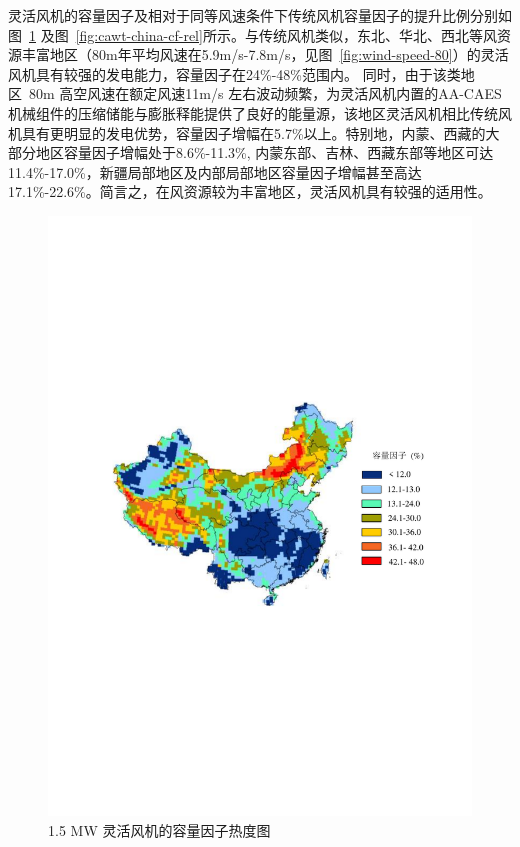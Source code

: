 灵活风机的容量因子及相对于同等风速条件下传统风机容量因子的提升比例分别如图~\ref{fig:cawt-china-cf-abs} 及图~\ref{fig:cawt-china-cf-rel}所示。与传统风机类似，东北、华北、西北等风资源丰富地区（80m年平均风速在5.9m/s-7.8m/s，见图~\ref{fig:wind-speed-80}）的灵活风机具有较强的发电能力，容量因子在24\%-48\%范围内。 同时，由于该类地区~80m 高空风速在额定风速11m/s 左右波动频繁，为灵活风机内置的AA-CAES机械组件的压缩储能与膨胀释能提供了良好的能量源，该地区灵活风机相比传统风机具有更明显的发电优势，容量因子增幅在5.7\%以上。特别地，内蒙、西藏的大部分地区容量因子增幅处于8.6\%-11.3\%, 内蒙东部、吉林、西藏东部等地区可达11.4\%-17.0\%，新疆局部地区及内部局部地区容量因子增幅甚至高达17.1\%-22.6\%。简言之，在风资源较为丰富地区，灵活风机具有较强的适用性。

\begin{figure}[!htp] %
  \centering
  \includegraphics[scale=0.78]{figures/Chap5-7-CA-WT-15-VDM2-Abs-2.pdf}
  \caption{1.5 MW 灵活风机的容量因子热度图}
  \label{fig:cawt-china-cf-abs}
\end{figure}

